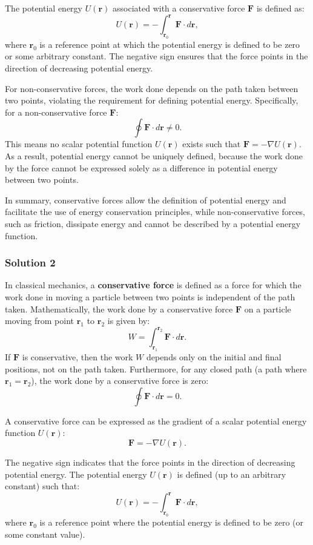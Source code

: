 \documentclass{article}
\begin{document}
The potential energy $U(\mathbf{r})$ associated with a conservative force $\mathbf{F}$ is defined as:
\[
U(\mathbf{r}) = - \int_{\mathbf{r}_0}^{\mathbf{r}} \mathbf{F} \cdot d\mathbf{r},
\]
where $\mathbf{r}_0$ is a reference point at which the potential energy is defined to be zero or some arbitrary constant. The negative sign ensures that the force points in the direction of decreasing potential energy.

For non-conservative forces, the work done depends on the path taken between two points, violating the requirement for defining potential energy. Specifically, for a non-conservative force $\mathbf{F}$:
\[
\oint \mathbf{F} \cdot d\mathbf{r} \neq 0.
\]
This means no scalar potential function $U(\mathbf{r})$ exists such that $\mathbf{F} = -\nabla U(\mathbf{r})$. As a result, potential energy cannot be uniquely defined, because the work done by the force cannot be expressed solely as a difference in potential energy between two points.

In summary, conservative forces allow the definition of potential energy and facilitate the use of energy conservation principles, while non-conservative forces, such as friction, dissipate energy and cannot be described by a potential energy function.

\subsubsection{Solution 2}
In classical mechanics, a \textbf{conservative force} is defined as a force for which the work done in moving a particle between two points is independent of the path taken. Mathematically, the work done by a conservative force $\mathbf{F}$ on a particle moving from point $\mathbf{r}_1$ to $\mathbf{r}_2$ is given by:
\[
W = \int_{\mathbf{r}_1}^{\mathbf{r}_2} \mathbf{F} \cdot d\mathbf{r}.
\]
If $\mathbf{F}$ is conservative, then the work $W$ depends only on the initial and final positions, not on the path taken. Furthermore, for any closed path (a path where $\mathbf{r}_1 = \mathbf{r}_2$), the work done by a conservative force is zero:
\[
\oint \mathbf{F} \cdot d\mathbf{r} = 0.
\]

A conservative force can be expressed as the gradient of a scalar potential energy function $U(\mathbf{r})$:
\[
\mathbf{F} = -\nabla U(\mathbf{r}).
\]

The negative sign indicates that the force points in the direction of decreasing potential energy. The potential energy $U(\mathbf{r})$ is defined (up to an arbitrary constant) such that:
\[
U(\mathbf{r}) = - \int_{\mathbf{r}_0}^{\mathbf{r}} \mathbf{F} \cdot d\mathbf{r},
\]
where $\mathbf{r}_0$ is a reference point where the potential energy is defined to be zero (or some constant value).
\end{document}
